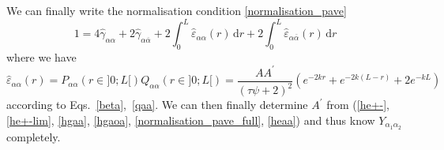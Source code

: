 \documentclass[pre,aps,superscriptaddress,nofootinbib]{revtex4}
\begin{document}
We can finally write the normalisation condition \eqref{normalisation_pave}
\begin{equation}
1 = 4 \hat{\gamma}_{\alpha\alpha} + 2 \hat{\gamma}_{\alpha\overline{\alpha}} + 2 \int_0^L \hat{\varepsilon}_{\alpha\alpha}(r) \, \mathrm{d}r + 2 \int_0^L \hat{\varepsilon}_{\alpha\overline{\alpha}}(r) \, \mathrm{d}r
\label{normalisation_pave_full}
\end{equation}
where we have
\begin{equation}
\hat{\varepsilon}_{\alpha\alpha}(r) = P_{\alpha\alpha}(r \in ]0; L[) Q_{\alpha\alpha}(r \in ]0; L[) = \frac{A A^{\prime}}{(\tau \psi + 2)^2} \left(e^{-2 k r} + e^{-2 k (L - r)} + 2 e^{-k L}\right)
\label{heaa}
\end{equation}
according to Eqs.~\ref{beta},~\ref{qaa}. We can then finally determine $A^{\prime}$ from (\ref{he+-}, \ref{he+-lim}, \ref{hgaa}, \ref{hgaoa}, \ref{normalisation_pave_full}, \ref{heaa}) and thus know $Y_{\alpha_1\alpha_2}$ completely.



{\renewcommand{\bibname}{References}}
\end{document}
